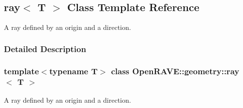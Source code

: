 \hypertarget{classOpenRAVE_1_1geometry_1_1ray}{
\subsection{ray$<$ T $>$ Class Template Reference}
\label{classOpenRAVE_1_1geometry_1_1ray}
}


A ray defined by an origin and a direction.  




\subsubsection{Detailed Description}
\subsubsection*{template$<$typename T$>$ class OpenRAVE::geometry::ray$<$ T $>$}

A ray defined by an origin and a direction. 